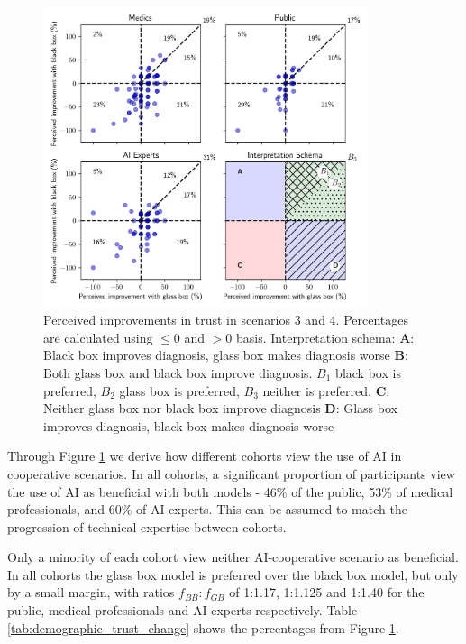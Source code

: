 \documentclass[manuscript,screen,review]{acmart}
\begin{document}
\begin{figure}[h!]
    \centering
    \includegraphics[width=0.85\textwidth]{graphics/Doctor_improvements_cooperation_scatter.jpg}
    \caption{\centering Perceived improvements in trust in scenarios 3 and 4. Percentages are calculated using $\leq 0$ and $>0$ basis.\hspace{\textwidth} Interpretation schema: \textbf{A}: Black box improves diagnosis, glass box makes diagnosis worse \hspace{\textwidth} \textbf{B}: Both glass box and black box improve diagnosis. \textbf{$B_1$} black box is preferred, \textbf{$B_2$} glass box is preferred, $B_3$ neither is preferred. \textbf{C}: Neither glass box nor black box improve diagnosis \textbf{D}: Glass box improves diagnosis, black box makes diagnosis worse}
    \label{fig:improvement}
\end{figure}

Through Figure \ref{fig:improvement} we derive how different cohorts view the use of AI in cooperative scenarios. In all cohorts, a significant proportion of participants view the use of AI as beneficial with both models - 46\% of the public, 53\% of medical professionals, and 60\% of AI experts. This can be assumed to match the progression of technical expertise between cohorts.

Only a minority of each cohort view neither AI-cooperative scenario as beneficial. In all cohorts the glass box model is preferred over the black box model, but only by a small margin, with ratios $f_{BB}:f_{GB}$ of 1:1.17, 1:1.125 and 1:1.40 for the public, medical professionals and AI experts respectively. Table \ref{tab:demographic_trust_change} shows the percentages from Figure \ref{fig:improvement}.
\end{document}
